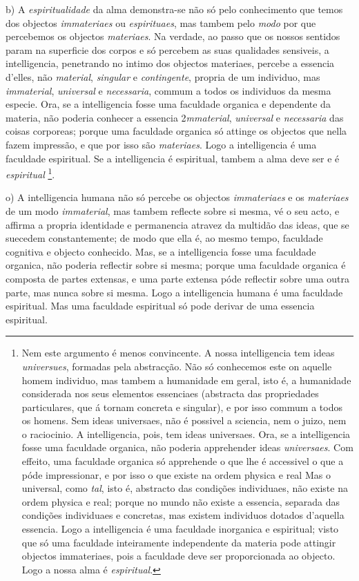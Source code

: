 b) A \emph{espiritualidade} da alma demonstra-se não só pelo conhecimento que temos dos objectos \emph{immateriaes} ou \emph{espirituaes}, mas tambem pelo \emph{modo} por que percebemos os objectos \emph{materiaes}. Na verdade, ao passo que os nossos sentidos param na superficie dos corpos e só percebem as suas qualidades sensiveis, a intelligencia, penetrando no intimo dos objectos materiaes, percebe a essencia d'elles, não \emph{material}, \emph{singular} e \emph{contingente}, propria de um individuo, mas \emph{immaterial}, \emph{universal} e \emph{necessaria}, commum a todos os individuos da mesma especie. Ora, se a intelligencia fosse uma faculdade organica e dependente da materia, não poderia conhecer a essencia 2\emph{mmaterial}, \emph{universal} e \emph{necessaria} das coisas corporeas; porque uma faculdade organica só attinge os objectos que nella fazem impressão, e que por isso são \emph{materiaes}. Logo a intelligencia   é uma faculdade espiritual. Se a intelligencia é espiritual, tambem a alma deve ser e é \emph{espiritual} \footnote{Nem este argumento é menos convincente. A nossa intelligencia tem ideas \emph{universues}, formadas pela abstracção. Não só conhecemos este on aquelle homem individuo, mas tambem a humanidade em geral, isto é, a humanidade considerada nos seus elementos essenciaes (abstracta das propriedades particulares, que á tornam concreta e singular), e por isso commum a todos os homens. Sem ideas universaes, não é possivel a sciencia, nem o juizo, nem o raciocinio. A intelligencia, pois, tem ideas universaes. Ora, se a intelligencia fosse uma faculdade organica, não poderia apprehender ideas \emph{universaes}. Com effeito, uma faculdade organica só apprehende o que lhe é accessivel o que a póde impressionar, e por isso o que existe na ordem physica e real Mas o universal, como \emph{tal}, isto é, abstracto das condições individuaes, não existe na ordem physica e real; porque no mundo não existe a essencia, separada das condições individuaes e concretas, mas existem individuos dotados d'aquella essencia. Logo a intelligencia é uma faculdade inorganica e espiritual; visto que só uma faculdade inteiramente independente da materia pode attingir objectos immateriaes, pois a faculdade deve ser proporcionada ao objecto. Logo a nossa alma é \emph{espiritual}.}.

o) A intelligencia humana não só percebe os objectos \emph{immateriaes} e os \emph{materiaes} de um modo \emph{immaterial}, mas tambem reflecte sobre si mesma, vé o seu acto, e affirma a propria identidade e permanencia atravez da multidão das ideas, que se suecedem constantemente; de modo que ella é, ao mesmo tempo, faculdade cognitiva e objecto conhecido. Mas, se a intelligencia fosse uma faculdade organica, não poderia reflectir sobre si mesma; porque uma faculdade organica é composta de partes extensas, e uma parte extensa póde reflectir sobre uma outra parte, mas nunca sobre si mesma. Logo a intelligencia humana é uma faculdade espiritual. Mas uma faculdade espiritual só pode derivar de uma essencia espiritual.

